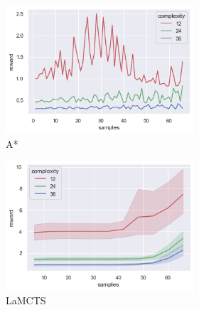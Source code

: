 \documentclass[bibliography=totoc]{scrartcl}
\begin{document}
\begin{figure}[H]
\begin{figure}[H]
	\centering
	\begin{subfigure}[b]{0.3\linewidth}
		\includegraphics[width=\linewidth]{img/maze_sample_reward_astar.png}
        \caption{A*}	
    \end{subfigure}
	\hspace{0.02\textwidth}
	\begin{subfigure}[b]{0.3\linewidth}
		\includegraphics[width=\linewidth]{img/maze_sample_reward_lamcts.png}
		\caption{LaMCTS}
	\end{subfigure}
	\hspace{0.02\textwidth}
	\begin{subfigure}[b]{0.3\linewidth}

\end{subfigure}
\end{figure}
\end{figure}
\end{document}
